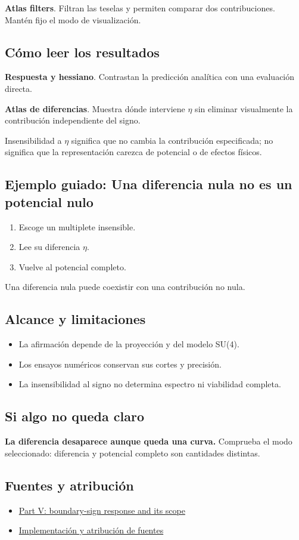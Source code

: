 \documentclass[11pt,a4paper]{article}
\begin{document}
\textbf{Atlas filters}. Filtran las teselas y permiten comparar dos contribuciones. Mantén fijo el modo de visualización.

\subsection*{Cómo leer los resultados}
\textbf{Respuesta y hessiano}. Contrastan la predicción analítica con una evaluación directa.

\textbf{Atlas de diferencias}. Muestra dónde interviene \ensuremath{\eta} sin eliminar visualmente la contribución independiente del signo.

Insensibilidad a \ensuremath{\eta} significa que no cambia la contribución especificada; no significa que la representación carezca de potencial o de efectos físicos.
\subsection*{Ejemplo guiado: Una diferencia nula no es un potencial nulo}
\begin{enumerate}
\item Escoge un multiplete insensible.
\item Lee su diferencia \ensuremath{\eta}.
\item Vuelve al potencial completo.
\end{enumerate}
Una diferencia nula puede coexistir con una contribución no nula.
\subsection*{Alcance y limitaciones}
\begin{itemize}
\item La afirmación depende de la proyección y del modelo SU(4).
\item Los ensayos numéricos conservan sus cortes y precisión.
\item La insensibilidad al signo no determina espectro ni viabilidad completa.
\end{itemize}
\subsection*{Si algo no queda claro}
\textbf{La diferencia desaparece aunque queda una curva.} Comprueba el modo seleccionado: diferencia y potencial completo son cantidades distintas.

\subsection*{Fuentes y atribución}
\begin{itemize}
\item \href{https://karlesmarin.github.io/ghu-explorer/papers/part-v/index.html}{Part V: boundary-sign response and its scope}
\item \href{https://github.com/karlesmarin/ghu-lab/blob/main/src/sections/eta_section.js}{Implementación y atribución de fuentes}
\end{itemize}
\end{document}
